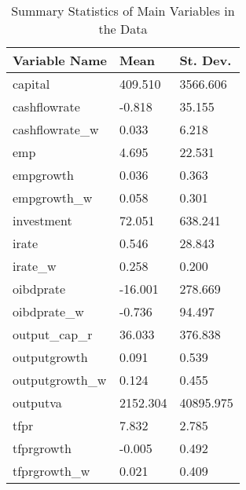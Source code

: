 \begin{table}

\caption{Summary Statistics of Main Variables in the Data}
\centering
\begin{tabular}[t]{lll}
\toprule
Variable Name & Mean & St. Dev.\\
\midrule
capital & 409.510 & 3566.606\\
cashflowrate & -0.818 & 35.155\\
cashflowrate\_w & 0.033 & 6.218\\
emp & 4.695 & 22.531\\
empgrowth & 0.036 & 0.363\\
\addlinespace
empgrowth\_w & 0.058 & 0.301\\
investment & 72.051 & 638.241\\
irate & 0.546 & 28.843\\
irate\_w & 0.258 & 0.200\\
oibdprate & -16.001 & 278.669\\
\addlinespace
oibdprate\_w & -0.736 & 94.497\\
output\_cap\_r & 36.033 & 376.838\\
outputgrowth & 0.091 & 0.539\\
outputgrowth\_w & 0.124 & 0.455\\
outputva & 2152.304 & 40895.975\\
\addlinespace
tfpr & 7.832 & 2.785\\
tfprgrowth & -0.005 & 0.492\\
tfprgrowth\_w & 0.021 & 0.409\\
\bottomrule
\end{tabular}
\end{table}
